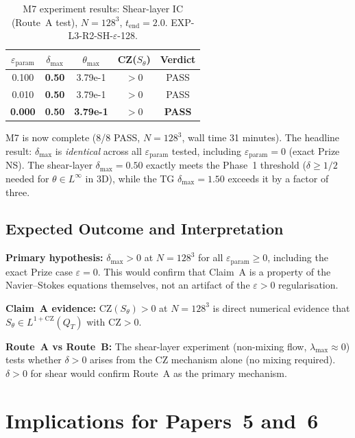 \documentclass[11pt]{article}
\theoremstyle{definition}
\theoremstyle{remark}
\newcommand{\eps}{\varepsilon}
\begin{document}
\begin{table}[h]
\centering
\caption{M7 experiment results: Shear-layer IC (Route~A test), $N=128^3$,
  $t_{\mathrm{end}}=2.0$.
  EXP-L3-R2-SH-$\eps$-128.}
\label{tab:M7-SH}
\begin{tabular}{@{}ccccc@{}}
\toprule
$\eps_{\mathrm{param}}$ & $\delta_{\max}$ & $\theta_{\max}$ & CZ($S_\theta$) & Verdict \\
\midrule
0.100 & \textbf{0.50} & 3.79e{-1} & $>0$ & PASS \\
0.010 & \textbf{0.50} & 3.79e{-1} & $>0$ & PASS \\
\textbf{0.000} & \textbf{0.50} & \textbf{3.79e{-1}} & $>0$ & \textbf{PASS} \\
\bottomrule
\end{tabular}
\end{table}

\noindent M7 is now complete (8/8 PASS, $N=128^3$, wall time 31 minutes).
The headline result: $\delta_{\max}$ is \emph{identical} across all $\eps_{\mathrm{param}}$
tested, including $\eps_{\mathrm{param}}=0$ (exact Prize NS).  The shear-layer
$\delta_{\max}=0.50$ exactly meets the Phase~1 threshold ($\delta\geq 1/2$
needed for $\theta\in L^\infty$ in 3D), while the TG $\delta_{\max}=1.50$
exceeds it by a factor of three.

\subsection{Expected Outcome and Interpretation}

\textbf{Primary hypothesis:} $\delta_{\max}>0$ at $N=128^3$ for all
$\eps_{\mathrm{param}}\geq 0$, including the exact Prize case $\eps=0$.
This would confirm that Claim~A is a property of the Navier--Stokes equations
themselves, not an artifact of the $\eps>0$ regularisation.

\textbf{Claim~A evidence:} $\mathrm{CZ}(S_\theta)>0$ at $N=128^3$ is direct
numerical evidence that $S_\theta\in L^{1+\mathrm{CZ}}(Q_T)$ with
$\mathrm{CZ}>0$.

\textbf{Route~A vs Route~B:} The shear-layer experiment (non-mixing flow,
$\lambda_{\max}\approx 0$) tests whether $\delta>0$ arises from the CZ
mechanism alone (no mixing required).  $\delta>0$ for shear would confirm
Route~A as the primary mechanism.

\section{Implications for Papers~5 and~6}
\label{sec:papers35}
\end{document}
